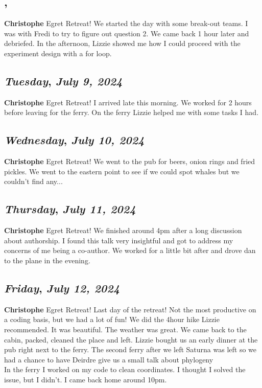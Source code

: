 \subsection*{\weekday, \day}
\textbf {Christophe}
Egret Retreat!
We started the day with some break-out teams. I was with Fredi to try to figure out question 2. We came back 1 hour later and debriefed. In the afternoon, Lizzie showed me how I could proceed with the experiment design with a for loop. 

\def\day{\textit{July 9, 2024}}
\def\weekday{\textit{Tuesday}}
\subsection*{\weekday, \day}
\textbf {Christophe}
Egret Retreat!
I arrived late this morning. We worked for 2 hours before leaving for the ferry. On the ferry Lizzie helped me with some tasks I had.

\def\day{\textit{July 10, 2024}}
\def\weekday{\textit{Wednesday}}
\subsection*{\weekday, \day}
\textbf {Christophe}
Egret Retreat!
We went to the pub for beers, onion rings and fried pickles. We went to the eastern point to see if we could spot whales but we couldn't find any...

\def\day{\textit{July 11, 2024}}
\def\weekday{\textit{Thursday}}
\subsection*{\weekday, \day}
\textbf {Christophe}
Egret Retreat!
We finished around 4pm after a long discussion about authorship. I found this talk very insightful and got to address my concerns of me being a co-author. We worked for a little bit after and drove dan to the plane in the evening.

\def\day{\textit{July 12, 2024}}
\def\weekday{\textit{Friday}}
\subsection*{\weekday, \day}
\textbf {Christophe}
Egret Retreat!
Last day of the retreat! Not the most productive on a coding basis, but we had a lot of fun! We did the 4hour hike Lizzie recommended. It was beautiful. The weather was great. 
We came back to the cabin, packed, cleaned the place and left. Lizzie bought us an early dinner at the pub right next to the ferry. The second ferry after we left Saturna was left so we had a chance to have Deirdre give us a small talk about phylogeny\\
In the ferry I worked on my code to clean coordinates. I thought I solved the issue, but I didn't. I came back home around 10pm.

